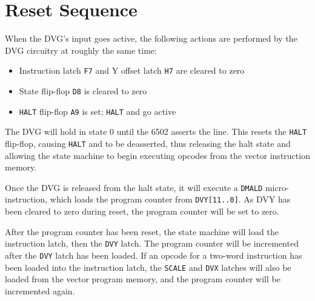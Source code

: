 \section{Reset Sequence}
When the DVG's  input goes active, the following actions are
performed by the DVG circuitry at roughly the same time:

\begin{itemize}
	\item{Instruction latch {\tt F7} and Y offset latch {\tt H7} are cleared to zero}
	\item{State flip-flop {\tt D8} is cleared to zero}
	\item{{\tt HALT} flip-flop {\tt A9} is set; {\tt HALT} and {\tt {}} go active}
\end{itemize}

The DVG will hold in state 0 until the 6502 asserts the {\tt {}}
line. This resets the {\tt HALT} flip-flop, causing {\tt HALT} and
{\tt {}} to be deasserted, thus releasing the halt state and allowing
the state machine to begin executing opcodes from the vector instruction memory.

Once the DVG is released from the halt state, it will execute a {\tt DMALD}
micro-instruction, which loads the program counter from {\tt DVY[11..0]}. As
DVY has been cleared to zero during reset, the program counter will be set to
zero.

After the program counter has been reset, the state machine will load the
instruction latch, then the {\tt DVY} latch. The program counter will be
incremented after the {\tt DVY} latch has been loaded. If an opcode for a
two-word instruction has been loaded into the instruction latch, the {\tt SCALE}
and {\tt DVX} latches will also be loaded from the vector program memory, and
the program counter will be incremented again.


